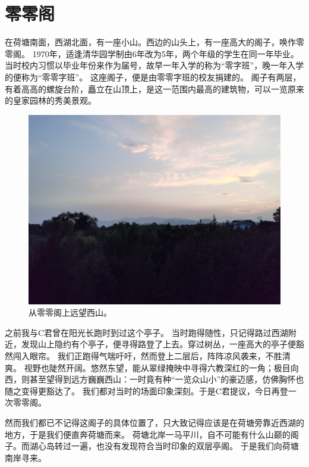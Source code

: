 \chapter{零零阁}

在荷塘南面，西湖北面，有一座小山。西边的山头上，有一座高大的阁子，唤作零零阁。%
1970年，适逢清华园学制由6年改为5年，两个年级的学生在同一年毕业。
当时校内习惯以毕业年份来作为届号，故早一年入学的称为“零字班”，晚一年入学的便称为“零零字班”。
这座阁子，便是由零零字班的校友捐建的。
阁子有两层，有着高高的螺旋台阶，矗立在山顶上，是这一范围内最高的建筑物，可以一览原来的皇家园林的秀美景观。

\begin{figure}[!b]
	\centering
	\includegraphics[width=\linewidth]{figures/零零阁暮望西山.jpg}
	从零零阁上远望西山。
\end{figure}

之前我与C君曾在阳光长跑时到过这个亭子。
当时跑得随性，只记得路过西湖附近，发现山上隐约有个亭子，便寻得路登了上去。穿过树丛，一座高大的亭子便豁然闯入眼帘。
我们正跑得气喘吁吁，然而登上二层后，阵阵凉风袭来，不胜清爽。
视野也陡然开阔。悠然东望，能从翠绿掩映中寻得六教深红的一角；极目向西，则甚至望得到远方巍巍西山：一时竟有种“一览众山小”的豪迈感，仿佛胸怀也随之变得更豁达了。
我们都对当时的场面印象深刻。于是C君提议，今日再登一次零零阁。

然而我们都已不记得这阁子的具体位置了，只大致记得应该是在荷塘旁靠近西湖的地方，于是我们便直奔荷塘而来。
荷塘北岸一马平川，自不可能有什么山巅的阁子。而湖心岛转过一遍，也没有发现符合当时印象的双层亭阁。
于是我们向荷塘南岸寻来。

